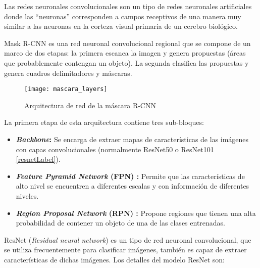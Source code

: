 Las redes neuronales convolucionales son  un tipo de redes neuronales artificiales  donde las “neuronas”  corresponden a campos receptivos de una manera muy similar a las neuronas en la corteza visual primaria de un cerebro biológico.

Mask R-CNN es una red neuronal convolucional regional que se compone de un marco de dos etapas: la primera escanea la imagen y genera propuestas (áreas que probablemente contengan un objeto). La segunda clasifica las propuestas y genera cuadros delimitadores y máscaras.

\begin{figure}[htb]
	\centering
	\texttt{[image: mascara\_layers]}
	\caption[Arquitectura de red de la máscara R-CNN]{Arquitectura de red de la máscara R-CNN \cite{segmentacionimagenes:mascara_layers}}
\end{figure}

La primera etapa de esta arquitectura contiene tres sub-bloques:

\begin{itemize}
    \item \textbf{\textit{Backbone}:} Se encarga de extraer mapas de características de las imágenes con capas convolucionales (normalmente ResNet50 o ResNet101 \ref{resnetLabel}).
    \item \textbf{\textit{Feature Pyramid Network} (FPN) \cite{segmentacionimagenes:FPN}:} Permite que las características de alto nivel se encuentren a diferentes escalas y con información de diferentes niveles.
    \item \textbf{\textit{Region Proposal Network} (RPN) \cite{segmentacionimagenes:RPN}:} Propone regiones que tienen una alta probabilidad de contener un objeto de una de las clases entrenadas.
\end{itemize}

ResNet\label{resnetLabel} (\textit{Residual neural network}) \cite{ResNet} es un tipo de red neuronal convolucional, que se utiliza frecuentemente para clasificar imágenes, también es capaz de extraer características de dichas imágenes. Los detalles del modelo ResNet son:

